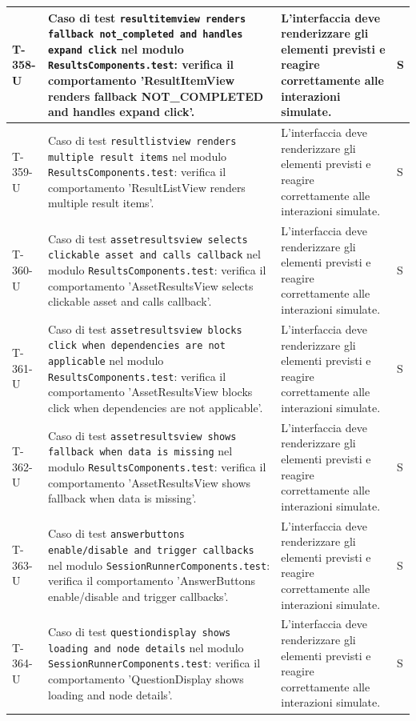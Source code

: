 \documentclass[a4paper,12pt]{article}
\begin{document}
{{\begin{longtable}{|>{\RaggedRight\arraybackslash}p{1.55cm}|>{\RaggedRight\arraybackslash}p{8.0cm}|>{\RaggedRight\arraybackslash}p{4.6cm}|>{\RaggedRight\arraybackslash}p{1.2cm}|}
        \hline
        T-358-U & Caso di test \texttt{resultitemview renders fallback not\_completed and handles expand click} nel modulo \texttt{ResultsComponents.test}: verifica il comportamento 'ResultItemView renders fallback NOT\_COMPLETED and handles expand click'. & L'interfaccia deve renderizzare gli elementi previsti e reagire correttamente alle interazioni simulate. & S \\
        \hline
        T-359-U & Caso di test \texttt{resultlistview renders multiple result items} nel modulo \texttt{ResultsComponents.test}: verifica il comportamento 'ResultListView renders multiple result items'. & L'interfaccia deve renderizzare gli elementi previsti e reagire correttamente alle interazioni simulate. & S \\
        \hline
        T-360-U & Caso di test \texttt{assetresultsview selects clickable asset and calls callback} nel modulo \texttt{ResultsComponents.test}: verifica il comportamento 'AssetResultsView selects clickable asset and calls callback'. & L'interfaccia deve renderizzare gli elementi previsti e reagire correttamente alle interazioni simulate. & S \\
        \hline
        T-361-U & Caso di test \texttt{assetresultsview blocks click when dependencies are not applicable} nel modulo \texttt{ResultsComponents.test}: verifica il comportamento 'AssetResultsView blocks click when dependencies are not applicable'. & L'interfaccia deve renderizzare gli elementi previsti e reagire correttamente alle interazioni simulate. & S \\
        \hline
        T-362-U & Caso di test \texttt{assetresultsview shows fallback when data is missing} nel modulo \texttt{ResultsComponents.test}: verifica il comportamento 'AssetResultsView shows fallback when data is missing'. & L'interfaccia deve renderizzare gli elementi previsti e reagire correttamente alle interazioni simulate. & S \\
        \hline
        T-363-U & Caso di test \texttt{answerbuttons enable/disable and trigger callbacks} nel modulo \texttt{SessionRunnerComponents.test}: verifica il comportamento 'AnswerButtons enable/disable and trigger callbacks'. & L'interfaccia deve renderizzare gli elementi previsti e reagire correttamente alle interazioni simulate. & S \\
        \hline
        T-364-U & Caso di test \texttt{questiondisplay shows loading and node details} nel modulo \texttt{SessionRunnerComponents.test}: verifica il comportamento 'QuestionDisplay shows loading and node details'. & L'interfaccia deve renderizzare gli elementi previsti e reagire correttamente alle interazioni simulate. & S \\

\end{longtable}}}
\end{document}
